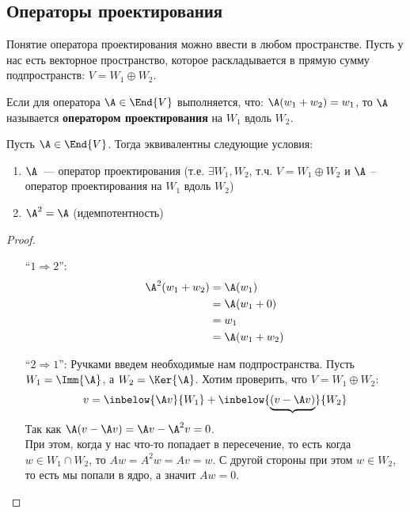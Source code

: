 \subsection{Операторы проектирования}
Понятие оператора проектирования можно ввести в любом пространстве. Пусть у нас есть 
векторное пространство, которое раскладывается в прямую сумму подпространств: $V = W_1 \oplus W_2$. 

\begin{conj}
    Если для оператора $\A \in \End{V}$ выполняется, что:  
    $\A(w_1 + w_2) = w_1$, то $\A$ называется \textbf{оператором проектирования} на $W_1$ вдоль $W_2$. 
\end{conj}

\begin{theorem}
    Пусть $\A \in \End{V}$. 
    Тогда эквивалентны следующие условия:
    \begin{enumerate}
        \item $\A$~--- оператор проектирования (т.е. $\exists W_1, W_2$, т.ч. $V = W_1 \oplus W_2$ и 
            $\A$ -- оператор проектирования на $W_1$ вдоль $W_2$)
        \item $\A^2 = \A$ (идемпотентность)
    \end{enumerate}
    \begin{proof} \quad

        \begin{itemize}
            \item[``$1 \Rightarrow 2$'':]
            \begin{align*}
                \A^2 (w_1 + w_2) &= \A(w_1) \\
                &= \A(w_1 + 0) \\
                &= w_1 \\
                &= \A(w_1 + w_2)
            \end{align*}
            \item[``$2 \Rightarrow 1$'':] Ручками введем необходимые нам подпространства. 
                Пусть $W_1 = \Imm{\A}$, а $W_2 = \Ker{\A}$. 
                Хотим проверить, что $V = W_1 \oplus W_2$:
                \begin{gather*}
                    v = \inbelow{\A v }{W_1} + \inbelow{\underbrace{(v - \A v)}}{W_2}
                \end{gather*}
                Так как $\A(v - \A v) = \A v - \A^2 v = 0$. \\
                При этом, когда у нас что-то попадает в пересечение, то есть когда $w \in W_1 \cap W_2$, 
                то $Aw = A^2 w = Av = w$. С другой стороны при этом $w \in W_2$, то есть мы попали в ядро, а значит $Aw = 0$.
                

\end{itemize}
\end{proof}
\end{theorem}
